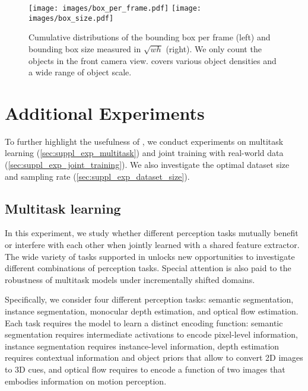 \begin{table*}[t]
\label{tab:multitask_four_tasks}
\end{table*}\begin{figure}[t]
    \centering
    \texttt{[image: images/box\_per\_frame.pdf]} \hfill
    \texttt{[image: images/box\_size.pdf]}
    \caption{Cumulative distributions of the bounding box per frame (left) and  bounding box size measured in $\sqrt{wh}$ (right). We only count the objects in the front camera view.  \thedataset{} covers various object densities and a wide range of object scale.}
    \label{fig:bounding_box}
\end{figure}

\section{Additional Experiments} \label{sec:suppl_exp}
To further highlight the usefulness of \thedataset{},  we conduct experiments on multitask learning (\autoref{sec:suppl_exp_multitask}) and joint training with real-world data (\autoref{sec:suppl_exp_joint_training}). We also investigate the optimal dataset size and sampling rate (\autoref{sec:suppl_exp_dataset_size}).

\subsection{Multitask learning} \label{sec:suppl_exp_multitask}
In this experiment, we study whether different perception tasks mutually benefit or interfere with each other when jointly learned with a shared feature extractor.  
The wide variety of tasks supported in \thedataset{} unlocks new opportunities to  investigate different combinations of perception tasks. 
Special attention is also paid to the robustness of multitask models under incrementally shifted domains.

Specifically, we consider four different perception tasks: semantic segmentation, instance segmentation, monocular depth estimation, and optical flow estimation. 
Each task requires the model to learn a distinct encoding function: semantic segmentation requires intermediate activations to encode pixel-level information, instance segmentation requires instance-level information, depth estimation requires contextual information and object priors that allow to convert 2D images to 3D cues, and optical flow requires to encode a function of two images that embodies information on motion perception.

